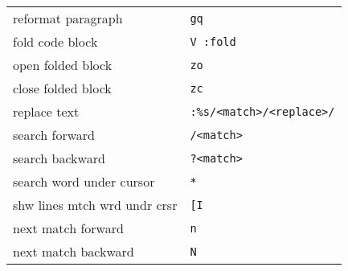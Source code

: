 \documentclass[report,twocolumn]{IEEEtran}
\begin{document}
\begin{center}
\begin{tabular}{ l | l }
reformat paragraph & \texttt{gq} \\
fold code block & \texttt{V :fold} \\
open folded block & \texttt{zo} \\
close folded block & \texttt{zc} \\
replace text & \texttt{:\%s/<match>/<replace>/} \\
\hline
search forward & \texttt{/<match>} \\
search backward & \texttt{?<match>} \\
search word under cursor & \texttt{*} \\
shw lines mtch wrd undr crsr & \texttt{[I} \\
next match forward & \texttt{n} \\
next match backward & \texttt{N} \\
\hline
\end{tabular}
\end{center}
\end{document}
